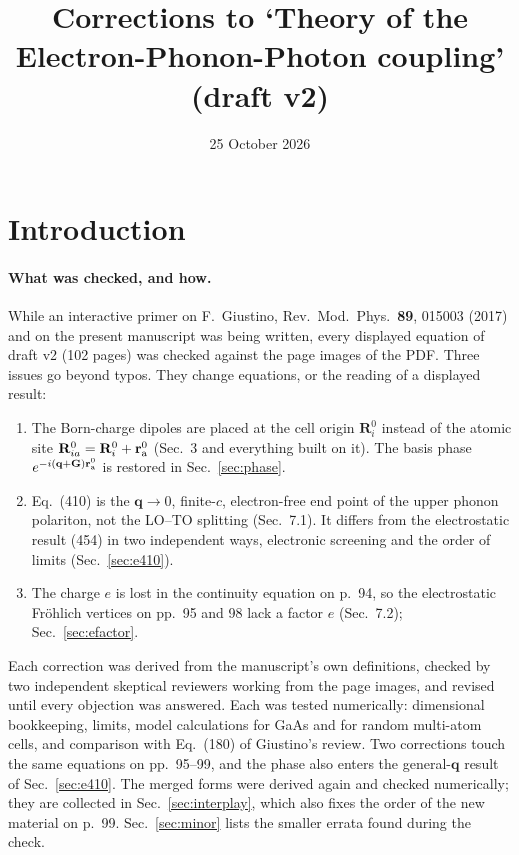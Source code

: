 \documentclass[11pt]{article}
\title{Corrections to `Theory of the Electron-Phonon-Photon coupling' (draft v2)}
\author{}
\date{25 October 2026}
\begin{document}
\maketitle

\section{Introduction}\label{sec:intro}

\paragraph{What was checked, and how.}
While an interactive primer on F.~Giustino, Rev.\ Mod.\ Phys.\ \textbf{89}, 015003 (2017) and on the
present manuscript was being written, every displayed equation of draft v2 (102 pages) was checked
against the page images of the PDF. Three issues go beyond typos. They change equations, or the reading
of a displayed result:
\begin{enumerate}
\item The Born-charge dipoles are placed at the cell origin $\mathbf R^0_i$ instead of the atomic site
$\mathbf R^0_{ia}=\mathbf R^0_i+\mathbf r^0_{\rm a}$ (Sec.~3 and everything built on it). The basis phase
$e^{-i(\mathbf q+\mathbf G)\mathbf r^0_{\rm a}}$ is restored in Sec.~\ref{sec:phase}.
\item Eq.~(410) is the $\mathbf q\to0$, finite-$c$, electron-free end point of the upper phonon
polariton, not the LO--TO splitting (Sec.~7.1). It differs from the electrostatic result (454) in two
independent ways, electronic screening and the order of limits (Sec.~\ref{sec:e410}).
\item The charge $e$ is lost in the continuity equation on p.~94, so the electrostatic Fr\"ohlich
vertices on pp.~95 and 98 lack a factor $e$ (Sec.~7.2); Sec.~\ref{sec:efactor}.
\end{enumerate}
Each correction was derived from the manuscript's own definitions, checked by two independent
skeptical reviewers working from the page images, and revised until every objection was answered.
Each was tested numerically: dimensional bookkeeping, limits, model calculations for GaAs and for
random multi-atom cells, and comparison with Eq.~(180) of Giustino's review. Two corrections touch
the same equations on pp.~95--99, and the phase also enters the general-$\mathbf q$ result of
Sec.~\ref{sec:e410}. The merged forms were derived again and checked numerically; they are
collected in Sec.~\ref{sec:interplay}, which also fixes the order of the new material on p.~99.
Sec.~\ref{sec:minor} lists the smaller errata found during the check.
\end{document}

